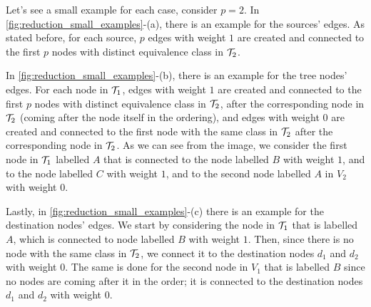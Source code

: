 \begin{example}[Edges]
    Let's see a small example for each case, consider $p=2$. In \cref{fig:reduction_small_examples}-(a), there is an example for the sources' edges. As stated before, for each source, $p$ edges with weight $1$ are created and connected to the first $p$ nodes with distinct equivalence class in $\mathcal{T}_{2}$.

    In \cref{fig:reduction_small_examples}-(b), there is an example for the tree nodes' edges. For each node in $\mathcal{T}_{1}$, edges with weight $1$ are created and connected to the first $p$ nodes with distinct equivalence class in $\mathcal{T}_{2}$, after the corresponding node in $\mathcal{T}_{2}$ (coming after the node itself in the ordering), and edges with weight $0$ are created and connected to the first node with the same class in $\mathcal{T}_{2}$ after the corresponding node in $\mathcal{T}_{2}$. As we can see from the image, we consider the first node in $\mathcal{T}_{1}$ labelled $A$ that is connected to the node labelled $B$ with weight $1$, and to the node labelled $C$ with weight $1$, and to the second node labelled $A$ in $V_2$ with weight $0$.

    Lastly, in \cref{fig:reduction_small_examples}-(c) there is an example for the destination nodes' edges. We start by considering the node in $\mathcal{T}_{1}$ that is labelled $A$, which is connected to node labelled $B$ with weight $1$. Then, since there is no node with the same class in $\mathcal{T}_{2}$, we connect it to the destination nodes $d_1$ and $d_2$ with weight $0$. The same is done for the second node in $V_1$ that is labelled $B$ since no nodes are coming after it in the order; it is connected to the destination nodes $d_1$ and $d_2$ with weight $0$.

    \begin{figure}[H]
        \centering
        \begin{subfigure}[b]{0.3\textwidth}
            \centering
\end{subfigure}
\end{figure}
\end{example}
